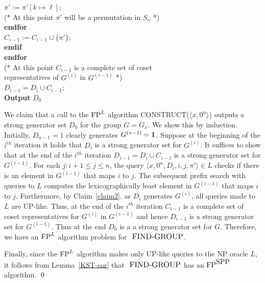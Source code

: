\documentclass{elsart}
\newcommand{\KW}[1]{{\bf #1}}
\newcommand{\FP}{\mbox{\rm FP}}
\newcommand{\SPP}{\mbox{\rm SPP}}
\newcommand{\FINDGROUP}{\mbox{\small\rm FIND{-}GROUP}}
\renewcommand{\th}[1]{\ensuremath{#1^{th}}}
\renewcommand{\angle}[1]{\langle #1\rangle}
\begin{document}
\begin{pf}
\begin{tabbing}
\> \> \> \> $\pi' := \pi'[ k \mapsto \ell ]$;\\
\> \> \> \> (* At this point $\pi'$ will be a permutation in $S_n$ *)\\
\> \> \> \KW{endfor}\\
\> \> \> $C_{i-1}:= C_{i-1} \cup \{\pi'\}$;\\
\> \> \> \KW{endif}\\
\> \>  \KW{endfor}\\
\> \> (* At this point $C_{i-1}$ is a complete set of coset\\
\> \>  representatives of $G^{(i)}$ in $G^{(i-1)}$ *)\\
\>                 $D_{i-1} = D_i \cup C_{i-1}$;\\
\KW{Output} {$D_0$}
\end{tabbing}
        
We claim that a call to the $\FP^L$ algorithm
CONSTRUCT($\angle{x,0^n}$) outputs a strong generator set $D_0$ for
the group $G=G_x$. We show this by induction. Initially, $D_{n-1}=1$
clearly generates $G^{(n-1)}={\bf 1}$. Suppose at the beginning of the
$\th{i}$ iteration it holds that $D_i$ is a strong generator set for
$G^{(i)}$. It suffices to show that at the end of the $\th{i}$
iteration $D_{i-1} = D_i \cup C_{i-1}$ is a strong generator set for
$G^{(i-1)}$.  For each $j: i+1\leq j\leq n$, the query
$\angle{x,0^n,D_i,i,j,\pi'} \in L$ checks if there is an element in
$G^{(i-1)}$ that maps $i$ to $j$. The subsequent prefix search with
queries to $L$ computes the lexicographically least element in
$G^{(i-1)}$ that maps $i$ to $j$.  Furthermore, by Claim~\ref{claim2},
as $D_i$ generates $G^{(i)}$, all queries made to $L$ are UP-like.
Thus, at the end of the $\th{i}$ iteration $C_{i-1}$ is a complete set
of coset representatives for $G^{(i)}$ in $G^{(i-1)}$ and hence
$D_{i-1}$ is a strong generator set for $G^{(i-1)}$.  Thus at the end
$D_0$ is a a strong generator set for $G$. Therefore, we have an
$\FP^L$ algorithm problem for $\FINDGROUP$.

Finally, since the $\FP^L$ algorithm makes only UP-like queries to the
NP oracle $L$, it follows from Lemma~\ref{KST-cor} that $\FINDGROUP$
has an $\FP^{\SPP}$ algorithm. \qed
\end{pf}
\end{document}
